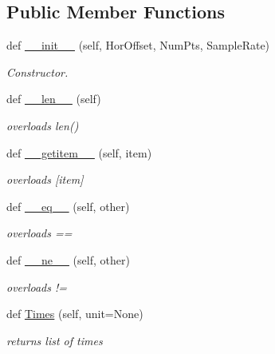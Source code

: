 \subsection*{Public Member Functions}
\begin{DoxyCompactItemize}
\item 
def \hyperlink{classSignalIntegrity_1_1TimeDomain_1_1Waveform_1_1TimeDescriptor_1_1TimeDescriptor_a82ea8eeea7b21f9766fa212014721486}{\+\_\+\+\_\+init\+\_\+\+\_\+} (self, Hor\+Offset, Num\+Pts, Sample\+Rate)
\begin{DoxyCompactList}\small\item\em Constructor. \end{DoxyCompactList}\item 
def \hyperlink{classSignalIntegrity_1_1TimeDomain_1_1Waveform_1_1TimeDescriptor_1_1TimeDescriptor_a810fdc262754b6d21f5acd0e280d4daf}{\+\_\+\+\_\+len\+\_\+\+\_\+} (self)
\begin{DoxyCompactList}\small\item\em overloads len() \end{DoxyCompactList}\item 
def \hyperlink{classSignalIntegrity_1_1TimeDomain_1_1Waveform_1_1TimeDescriptor_1_1TimeDescriptor_aab91ae2e037c39b631a69273c277bfe9}{\+\_\+\+\_\+getitem\+\_\+\+\_\+} (self, item)
\begin{DoxyCompactList}\small\item\em overloads \mbox{[}item\mbox{]} \end{DoxyCompactList}\item 
def \hyperlink{classSignalIntegrity_1_1TimeDomain_1_1Waveform_1_1TimeDescriptor_1_1TimeDescriptor_ad794ff077f2f05f228a7109f3670ac40}{\+\_\+\+\_\+eq\+\_\+\+\_\+} (self, other)
\begin{DoxyCompactList}\small\item\em overloads == \end{DoxyCompactList}\item 
def \hyperlink{classSignalIntegrity_1_1TimeDomain_1_1Waveform_1_1TimeDescriptor_1_1TimeDescriptor_aa0b54a20b36fcc55e1147de88d083072}{\+\_\+\+\_\+ne\+\_\+\+\_\+} (self, other)
\begin{DoxyCompactList}\small\item\em overloads != \end{DoxyCompactList}\item 
def \hyperlink{classSignalIntegrity_1_1TimeDomain_1_1Waveform_1_1TimeDescriptor_1_1TimeDescriptor_a5ba53f81d111ea013ebb7f55ed99d959}{Times} (self, unit=None)
\begin{DoxyCompactList}\small\item\em returns list of times \end{DoxyCompactList}\item 

\end{DoxyCompactItemize}
